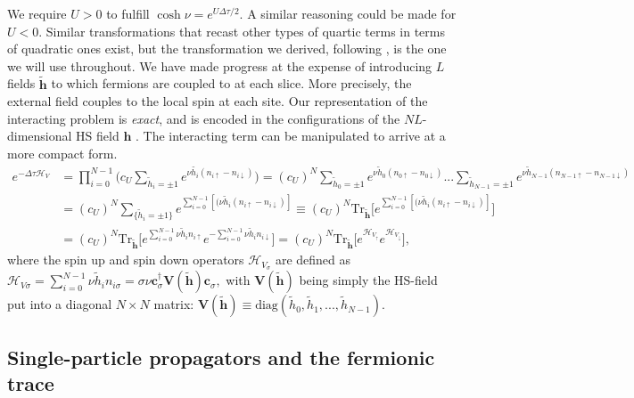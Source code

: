 We require $U > 0$ to fulfill $\cosh \nu = e^{U\Delta \tau / 2}$. A similar reasoning could be made for $U < 0$.
Similar transformations that recast other types of quartic terms in terms of quadratic ones exist, but the transformation we derived, following \cite{hirsch_monte_1983}, is the one we will use throughout.
We have made progress at the expense of introducing $L$ fields $\widetilde{\bm h}$ to which fermions are coupled to at each slice.
More precisely, the external field couples to the local spin at each site.
Our representation of the interacting problem is \emph{exact}, and is encoded in the configurations of the $NL$-dimensional HS field $\bm h$  \cite{hou_numerical_2009}.
The interacting term can be manipulated to arrive at a more compact form.
\begin{equation}\label{eq:exp_quartic}
\begin{split}
e^{-\Delta\tau \mathcal{H}_V} &= \prod_{i=0}^{N-1} \bigg( c_U \sum_{\widetilde{h}_i = \pm 1} e^{\nu \widetilde{h_i} ( n_{i\uparrow} - n_{i\downarrow} )} \bigg) 
=  (c_U)^N \sum_{\widetilde{h}_0 = \pm 1} e^{\nu \widetilde{h}_0 ( n_{0\uparrow} - n_{0\downarrow} )} ... \sum_{\widetilde{h}_{N-1} = \pm 1} e^{\nu \widetilde{h}_{N-1} ( n_{N-1\uparrow} - n_{N-1\downarrow} )} \\
&= (c_U)^N \sum_{ \{ \widetilde{h}_i = \pm 1 \}} e^{\sum_{i=0}^{N-1} [(\nu \widetilde{h}_i ( n_{i\uparrow} - n_{i\downarrow} ) ]} \equiv (c_U)^N \text{Tr}_{\widetilde{\bm h}} \bigg[ e^{\sum_{i=0}^{N-1} [(\nu \widetilde{h}_i ( n_{i\uparrow} - n_{i\downarrow} ) ]} \bigg] \\
&= (c_U)^N \text{Tr}_{\widetilde{\bm h}} \bigg[ e^{\sum_{i=0}^{N-1} \nu \widetilde{h}_i n_{i\uparrow}} e^{-\sum_{i=0}^{N-1} \nu \widetilde{h}_i n_{i\downarrow}} \bigg] = (c_U)^N \text{Tr}_{\widetilde{\bm h}} \bigg[ e^{\mathcal{H}_{V_\uparrow}} e^{\mathcal{H}_{V_\downarrow}} \bigg] ,
\end{split}
\end{equation}
where the spin up and spin down operators $\mathcal{H}_{V_\sigma}$ are defined as 
$
\mathcal{H}_{V\sigma} = \sum_{i=0}^{N-1} \nu \widetilde{h}_i n_{i\sigma} = \sigma \nu \bm c_\sigma^\dagger \bm V(\widetilde{\bm h}) \bm c_\sigma,
$
 with $\bm V(\widetilde{\bm h})$ being simply the HS-field put into a diagonal $N\times N$ matrix: $\bm V(\widetilde{\bm h}) \equiv \text{diag}(\widetilde{h}_0, \widetilde{h}_1, ..., \widetilde{h}_{N-1})$.

\subsection{Single-particle propagators and the fermionic trace}\label{subsec:fermiontrace}

